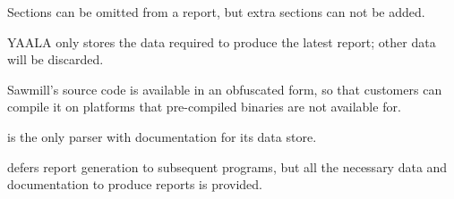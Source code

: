 \begin{table}[htb]
\begin{eqlist}
        \item [\dag{}] Sections can be omitted from a report, but extra
            sections can not be added.

        \item [\ddag{}] YAALA only stores the data required to produce the
            latest report; other data will be discarded.

        \item [\nialpha{}] Sawmill's source code is available in an
            obfuscated form, so that customers can compile it on platforms
            that pre-compiled binaries are not available for.

        \item [\nibeta{}] \parsername{} is the only parser with
            documentation for its data store.

        \item [\nichi{}] \parsername{} defers report generation to
            subsequent programs, but all the necessary data and
            documentation to produce reports is provided.

    \end{eqlist}

\end{table}

\clearpage{}
